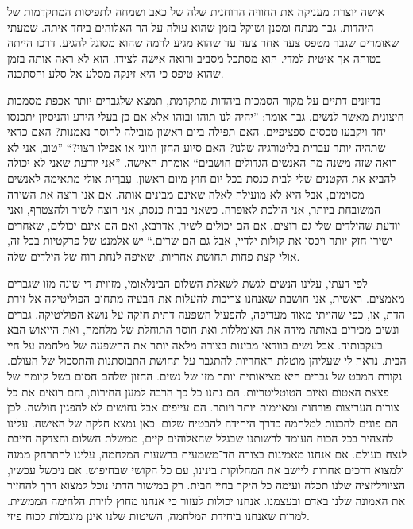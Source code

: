 \documentclass[14pt, article, extrafontsizes, twopage, a4paper]{memoir}
\begin{document}
{אישה יוצרת מעניקה את החוויה הרוחנית שלה של
כאב ושמחה לתפיסות המתקדמות של היהדות.
גבר מנתח ומסנן ושוקל בזמן שהוא
עולה על הר האלוהים ביחד איתה. שמעתי שאומרים שגבר
מטפס צעד אחר צעד עד שהוא מגיע לרמה שהוא מסוגל
להגיע. דרכו הייתה בטוחה אך איטית למדי. הוא מסתכל
מסביב ורואה אישה לצידו. הוא לא ראה אותה
בזמן שהוא טיפס כי היא זינקה מסלע אל סלע והסתכנה.

בדיונים דתיים על מקור הסמכות
ביהדות מתקדמת, תמצא שלגברים יותר אכפת
מסמכות חיצונית מאשר לנשים. גבר אומר: ”יהיה לנו
תוהו ובוהו אלא אם כן בעלי הידע והניסיון יתכנסו
יחד ויקבעו טכסים ספציפיים. האם תפילה ביום ראשון
מובילה לחוסר נאמנות? האם כדאי שתהיה יותר עברית
בליטורגיה שלנו? האם סיוע החזן חיוני או
אפילו רצוי?“ ”טוב, אני לא רואה שזה משנה מה
האנשים הגדולים חושבים“ אומרת האישה. ”אני יודעת שאני לא יכולה להביא
את הקטנים שלי לבית כנסת בכל יום חוץ מיום ראשון. עִברִית
אולי מתאימה לאנשים מסוימים, אבל היא לא מועילה
לאלה שאינם מבינים אותה. אם אני רוצה את השירה המשובחת ביותר,
אני הולכת לאופרה. כשאני בבית כנסת, אני רוצה
לשיר ולהצטרף, ואני יודעת שהילדים שלי גם רוצים. אם הם
יכולים לשיר, אדרבא, ואם הם אינם יכולים, שאחרים
ישירו חזק יותר ויכסו את קולות ילדיי, אבל גם הם
שרים.“ יש אלמנט של פרקטיות בכל
זה, אולי קצת פחות תחושת אחריות, שאיפה
לנחת רוח של הילדים שלה.

לפי דעתי, עלינו הנשים לגשת לשאלת השלום הבינלאומי, מזווית די שונה מזו
שגברים מאמצים. ראשית, אני חושבת שאנחנו צריכות להעלות
את הבעיה מתחום הפוליטיקה אל זירת
הדת, או, כפי שהייתי מאוד מעדיפה, להפעיל
השפעה דתית חזקה על נושא הפוליטיקה. גברים
ונשים מכירים באותה מידה את האומללות ואת
חוסר התוחלת של מלחמה, ואת הייאוש הבא בעקבותיה.
אבל נשים בוודאי מבינות בצורה מלאה יותר את ההשפעה
של מלחמה על חיי הבית. נראה לי שעליהן מוטלת האחריות
להתגבר על תחושת התבוסתנות והתסכול של העולם. נקודת המבט של גברים היא
מציאותית יותר מזו של נשים. החזון שלהם
חסום בשל קיומה של פצצת האטום ואיום
הטוטליטריות. הם נתנו כל כך הרבה למען
החירות, והם רואים את כל צורות העריצות פורחות
ומאיימות יותר ויותר. הם עייפים אבל
נחושים לא להפגין חולשה. לכן הם פונים להכנות למלחמה
כדרך היחידה להבטיח שלום. כאן נמצא
חלקה של האישה. עלינו להצהיר בכל הכוח
העומד לרשותנו שבגלל שהאלוהים קיים, ממשלת השלום
והצדקה חייבת לנצח בעולם. אם אנחנו מאמינות בצורה חד־משמעית
ברשעות המלחמה, עלינו להתרחק ממנה
ולמצוא דרכים אחרות ליישב את המחלוקות בינינו,
עם כל הקושי שבחיפוש. אם ניכשל עכשיו, הציוויליזציה שלנו
תכלה ועימה כל היקר בחיי הבית.
רק במישור הדתי נוכל למצוא
דרך להחזיר את האמונה שלנו באדם ובעצמנו. אנחנו
יכולות לעזור כי אנחנו מחוץ לזירת הלחימה הממשית.
למרות שאנחנו ביחידת המלחמה, השיטות שלנו אינן
מוגבלות לכוח פיזי.

}
\end{document}
